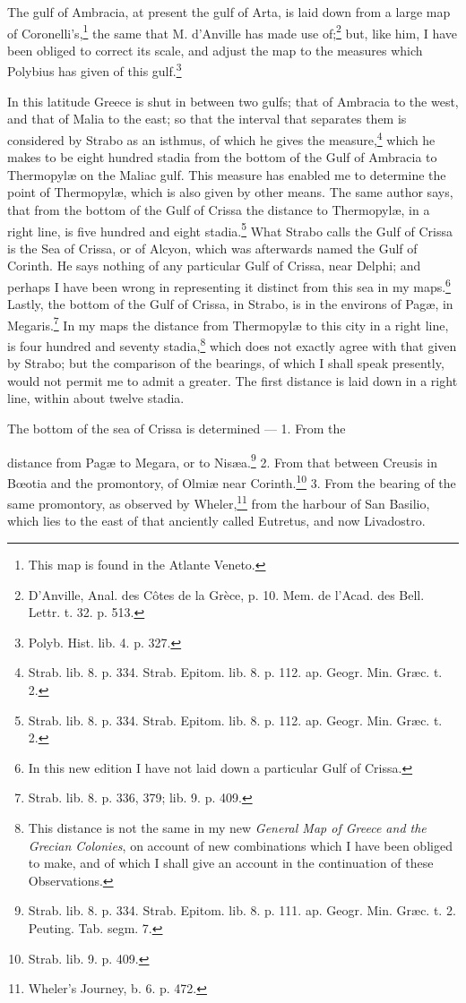 \documentclass[a4paper, 11pt, oneside, polutonikogreek, english]{article}
\begin{document}
The gulf of Ambracia, at present the gulf of Arta, is laid down from a large map of Coronelli's,\footnote{This map is found in the Atlante Veneto.} the same that M. d'Anville has made use of;\footnote{D'Anville, Anal. des Côtes de la Grèce, p. 10. Mem. de l'Acad. des Bell. Lettr. t. 32. p. 513.} but, like him, I have been obliged to correct its scale, and adjust the map to the measures which Polybius has given of this gulf.\footnote{Polyb. Hist. lib. 4. p. 327.}

In this latitude Greece is shut in between two gulfs; that of Ambracia to the west, and that of Malia to the east; so that the interval that separates them is considered by Strabo as an isthmus, of which he gives the measure,\footnote{Strab. lib. 8. p. 334. Strab. Epitom. lib. 8. p. 112. ap. Geogr. Min. Græc. t. 2.} which he makes to be eight hundred stadia from the bottom of the Gulf of Ambracia to Thermopylæ on the Maliac gulf. This measure has enabled me to determine the point of Thermopylæ, which is also given by other means. The same author says, that from the bottom of the Gulf of Crissa the distance to Thermopylæ, in a right line, is five hundred and eight stadia.\footnote{Strab. lib. 8. p. 334. Strab. Epitom. lib. 8. p. 112. ap. Geogr. Min. Græc. t. 2.} What Strabo calls the Gulf of Crissa is the Sea of Crissa, or of Alcyon, which was afterwards named the Gulf of Corinth. He says nothing of any particular Gulf of Crissa, near Delphi; and perhaps I have been wrong in representing it distinct from this sea in my maps.\footnote{In this new edition I have not laid down a particular Gulf of Crissa.} Lastly, the bottom of the Gulf of Crissa, in Strabo, is in the environs of Pagæ, in Megaris.\footnote{Strab. lib. 8. p. 336, 379; lib. 9. p. 409.} In my maps the distance from Thermopylæ to this city in a right line, is four hundred and seventy stadia,\footnote{This distance is not the same in my new \emph{General Map of Greece and the Grecian Colonies}, on account of new combinations which I have been obliged to make, and of which I shall give an account in the continuation of these Observations.} which does not exactly agree with that given by Strabo; but the comparison of the bearings, of which I shall speak presently, would not permit me to admit a greater. The first distance is laid down in a right line, within about twelve stadia.

The bottom of the sea of Crissa is determined --- 1. From the 

distance from Pagæ to Megara, or to Nisæa.\footnote{Strab. lib. 8. p. 334. Strab. Epitom. lib. 8. p. 111. ap. Geogr. Min. Græc. t. 2. Peuting. Tab. segm. 7.} 2. From that between Creusis in Bœotia and the promontory, of Olmiæ near Corinth.\footnote{Strab. lib. 9. p. 409.} 3. From the bearing of the same promontory, as observed by Wheler,\footnote{Wheler's Journey, b. 6. p. 472.} from the harbour of San Basilio, which lies to the east of that anciently called Eutretus, and now Livadostro.
\end{document}
